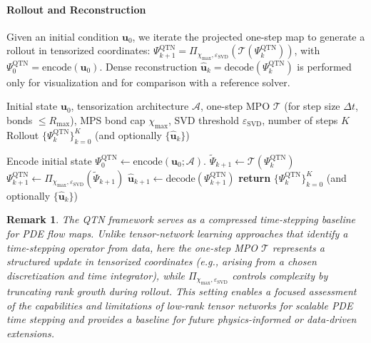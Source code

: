\documentclass[letterpaper, 10 pt, conference]{ieeeconf}  %
\newtheorem{remark}{Remark}
\begin{document}
\paragraph{Rollout and Reconstruction}
Given an initial condition $\mathbf{u}_0$, we iterate the projected one-step map
to generate a rollout in tensorized coordinates:
$\Psi_{k+1}^{\mathrm{QTN}}=\Pi_{\chi_{\max},\varepsilon_{\mathrm{SVD}}}(\mathcal{T}(\Psi_k^{\mathrm{QTN}}))$,
with $\Psi_0^{\mathrm{QTN}}=\mathrm{encode}(\mathbf{u}_0)$.
Dense reconstruction $\widehat{\mathbf{u}}_k=\mathrm{decode}(\Psi_k^{\mathrm{QTN}})$
is performed only for visualization and for comparison with a reference solver.


\begin{algorithm}[t]\small
\caption{Quantum-Inspired Tensor-Network (QTN) Time Stepping (MPO--MPS with Truncation)}
\label{alg:qtn}
\begin{algorithmic}[1]
\REQUIRE Initial state $\mathbf{u}_0$,
tensorization architecture $\mathcal{A}$,
one-step MPO $\mathcal{T}$ (for step size $\Delta t$, bonds $\le R_{\max}$),
MPS bond cap $\chi_{\max}$,
SVD threshold $\varepsilon_{\mathrm{SVD}}$,
number of steps $K$
\ENSURE Rollout $\{\Psi_k^{\mathrm{QTN}}\}_{k=0}^{K}$ (and optionally $\{\widehat{\mathbf{u}}_k\}$)

\STATE Encode initial state $\Psi_0^{\mathrm{QTN}} \gets \mathrm{encode}(\mathbf{u}_0;\mathcal{A})$.
    \STATE $\widetilde{\Psi}_{k+1} \gets \mathcal{T}(\Psi_k^{\mathrm{QTN}})$
    \STATE $\Psi_{k+1}^{\mathrm{QTN}} \gets \Pi_{\chi_{\max},\varepsilon_{\mathrm{SVD}}}(\widetilde{\Psi}_{k+1})$
    \STATE %
    $\widehat{\mathbf{u}}_{k+1} \gets \mathrm{decode}(\Psi_{k+1}^{\mathrm{QTN}})$
\ENDFOR
\STATE \textbf{return} $\{\Psi_k^{\mathrm{QTN}}\}_{k=0}^{K}$ (and optionally $\{\widehat{\mathbf{u}}_k\}$)
\end{algorithmic}
\end{algorithm}

\begin{remark}
The QTN framework serves as a compressed time-stepping baseline for PDE flow maps.
Unlike tensor-network learning approaches that
identify a time-stepping operator from data, here
the one-step MPO $\mathcal{T}$ represents a structured update in tensorized
coordinates (e.g., arising from a chosen discretization and time integrator),
while $\Pi_{\chi_{\max},\varepsilon_{\mathrm{SVD}}}$ controls complexity by truncating
rank growth during rollout. This setting enables a focused assessment of the
capabilities and limitations of low-rank tensor networks for scalable PDE time
stepping and provides a baseline for future physics-informed or data-driven
extensions.
\end{remark}
\end{document}
